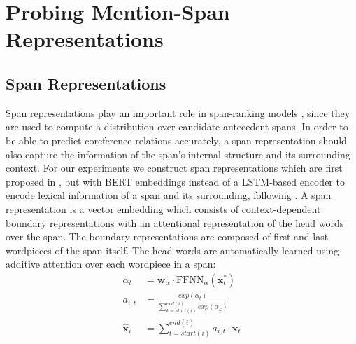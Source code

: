 \documentclass[11pt]{article}
\begin{document}
\section{Probing Mention-Span Representations}


\subsection{Span Representations}
\label{subsection:spanreps}

Span representations play an important role in span-ranking models \parencite{lee2017end,lee2018higher,joshi2019coref}, since they are used to compute a distribution over candidate antecedent spans. In order to be able to predict coreference relations accurately, a span representation should also capture the information of the span's internal structure and its surrounding context. For our experiments we construct span representations which are first proposed in \textcite{lee2017end}, but with BERT embeddings \parencite{devlin2019bert} instead of a LSTM-based encoder to encode lexical information of a span and its surrounding, following \textcite{joshi2019coref}. A span representation is a vector embedding which consists of context-dependent boundary representations with an attentional representation of the head words over the span. The boundary representations are composed of first and last wordpieces of the span itself. The head words are automatically learned using additive attention \parencite{bahdanau} over each wordpiece in a span: 
\begin{align}
\alpha_{t} &= \pmb{w}_{\alpha} \cdot \text{FFNN}_{\alpha}(\pmb{x}_{t}^{*}) \\ 
a_{i,t} &=  \frac{exp(\alpha_{t})}{\sum\limits_{k=start(i)}^{end(i)} exp(\alpha_{k})} \\ 
\hat{\pmb{x}}_{i} &= \sum\limits_{t=start(i)}^{end(i)} a_{i,t} \cdot \pmb{x}_{t}
\end{align}
\end{document}
